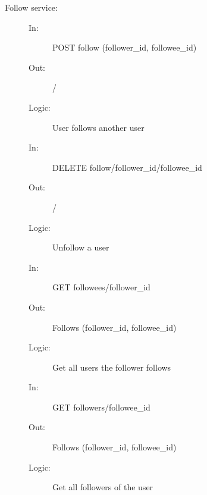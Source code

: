 \documentclass{article}
\begin{document}
\begin{description}
    \item [Follow service:]
    \begin{description}
        \item[]
        \item[In:] POST follow (follower\_id, followee\_id)
        \item[Out:] /
        \item[Logic:] User follows another user
        \item[]
    \end{description}
    \begin{description}
        \item[In:] DELETE follow/follower\_id/followee\_id
        \item[Out:] /
        \item[Logic:] Unfollow a user
        \item[]
    \end{description}
    \begin{description}
        \item[In:] GET followees/follower\_id
        \item[Out:] Follows (follower\_id, followee\_id)
        \item[Logic:] Get all users the follower follows
        \item[]
    \end{description}
        \begin{description}
        \item[In:] GET followers/followee\_id
        \item[Out:] Follows (follower\_id, followee\_id)
        \item[Logic:] Get all followers of the user
    \end{description}
\end{description}
\end{document}
